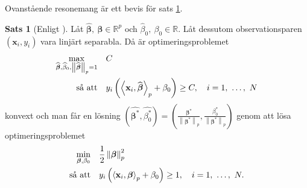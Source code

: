 \documentclass[a4paper, 12pt]{report}
\theoremstyle{definition}
\newtheorem{thm}{Sats}[section]
\newtheorem{cor}[thm]{Korollarium}
\theoremstyle{remark}
\newcommand{\bfbeta}{{\boldsymbol{\beta}}}
\newcommand{\bfx}{\mathbf{x}}
\newcommand{\llangle}{\left\langle}
\newcommand{\rrangle}{\right\rangle}
\newcommand{\inner}[2]{\llangle #1, #2 \rrangle}
\begin{document}
Ovanstående resonemang är ett bevis för sats \ref{thm:primallinearproblem}.
\begin{thm}[Enligt \cite{ESL}]\label{thm:primallinearproblem}
	Låt $\widehat{\bfbeta},~\bfbeta \in \mathbb{R}^p$ och $\widehat{\beta}_0,~\beta_0 \in \mathbb{R}$. Låt dessutom observationsparen $\left(\mathbf{x}_i, y_i\right)$ vara linjärt separabla. Då är optimeringsproblemet
	\begin{equation*}
	\begin{aligned}
	\operatornamewithlimits{max}_{\widehat{\bfbeta}, \widehat{\beta}_0, \left\|\widehat{\bfbeta}
\right\|_p=1} & & &C\\
	\text{så att} & & &y_i\left(\inner{\bfx_i}{\widehat{\bfbeta}}_p+\beta_0\right)\geq C,\quad i=1,~\dots,~N
	\end{aligned}
	\end{equation*}
	konvext och man får en lösning $\left(\widehat{\bfbeta^*}, \widehat{\beta_0^*}\right)=\left(\frac{\bfbeta^*}{\left\|\bfbeta^*\right\|_p}, \frac{\beta^*_0}{\left\|\bfbeta^*\right\|_p}\right)$ genom att lösa optimeringsproblemet
	\begin{equation*}
	\begin{aligned}
	\operatornamewithlimits{min}_{\bfbeta, \beta_0} & & &\frac{1}{2}\left\|\bfbeta
\right\|_p^2\\
	\text{så att} & & &y_i\left(\inner{\bfx_i}{\bfbeta}_p+\beta_0\right)\geq 1,\quad i=1,~\dots,~N.
	\end{aligned}
	\end{equation*}
\end{thm}
\end{document}
